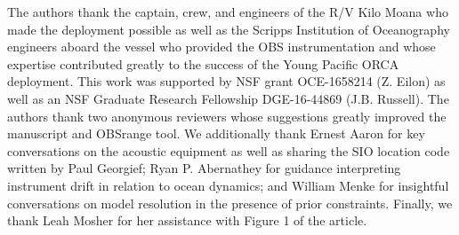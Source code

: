 The authors thank the captain, crew, and engineers of the R/V Kilo Moana who made the deployment possible as well as the Scripps Institution of Oceanography engineers aboard the vessel who provided the OBS instrumentation and whose expertise contributed greatly to the success of the Young Pacific ORCA deployment. This work was supported by NSF grant OCE-1658214 (Z. Eilon) as well as an NSF Graduate Research Fellowship DGE-16-44869 (J.B. Russell). The authors thank two anonymous reviewers whose suggestions greatly improved the manuscript and OBSrange tool. We additionally thank Ernest Aaron for key conversations on the acoustic equipment as well as sharing the SIO location code written by Paul Georgief; Ryan P. Abernathey for guidance interpreting instrument drift in relation to ocean dynamics; and William Menke for insightful conversations on model resolution in the presence of prior constraints. Finally, we thank Leah Mosher for her assistance with Figure 1 of the article.